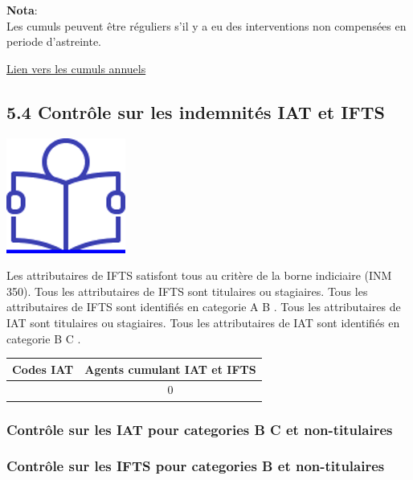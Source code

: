 \textbf{Nota}:\\
Les cumuls peuvent être réguliers s'il y a eu des interventions non
compensées en periode d'astreinte.

\href{../Bases/Reglementation/Cum_astreintes_HS_irreg.csv}{Lien vers les
cumuls annuels}

\hypertarget{controle-sur-les-indemnites-iat-et-ifts}{%
\subsection{5.4 Contrôle sur les indemnités IAT et
IFTS}\label{controle-sur-les-indemnites-iat-et-ifts}}

\href{../Docs/Notices/fiche_IAT_IFTS.odt}{\includegraphics{icones/Notice.png}}

Les attributaires de IFTS satisfont tous au critère de la borne
indiciaire (INM 350). Tous les attributaires de IFTS sont titulaires ou
stagiaires. Tous les attributaires de IFTS sont identifiés en categorie
A B . Tous les attributaires de IAT sont titulaires ou stagiaires. Tous
les attributaires de IAT sont identifiés en categorie B C .

\begin{longtable}[]{@{}cc@{}}
\toprule
Codes IAT & Agents cumulant IAT et IFTS\tabularnewline
\midrule
\endhead
& 0\tabularnewline
\bottomrule
\end{longtable}

\hypertarget{controle-sur-les-iat-pour-categories-b-c-et-non-titulaires}{%
\subsubsection{Contrôle sur les IAT pour categories B C et
non-titulaires}\label{controle-sur-les-iat-pour-categories-b-c-et-non-titulaires}}

\hypertarget{controle-sur-les-ifts-pour-categories-b-et-non-titulaires}{%
\subsubsection{Contrôle sur les IFTS pour categories B et
non-titulaires}\label{controle-sur-les-ifts-pour-categories-b-et-non-titulaires}}

